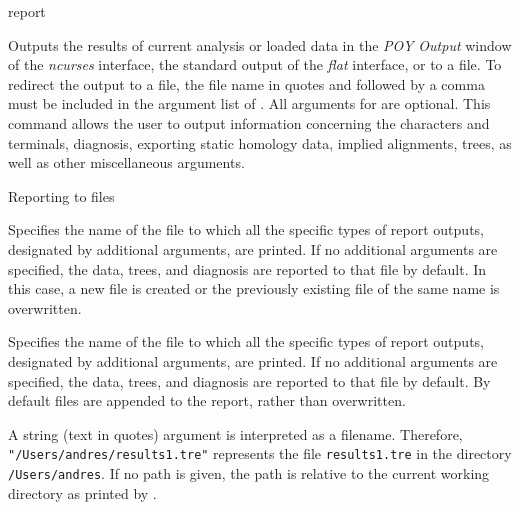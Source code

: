 \begin{command}{report}{}


	\begin{poydescription} 
        Outputs the results of current analysis or loaded data in the \emph{POY Output}
        window of the \emph{ncurses} interface, the standard output of the \emph{flat}
        interface, or to a file. To redirect the output to a file, the file name in 
        quotes and followed by a comma must be included in the argument list
        of . All arguments for  are
        optional.  This command allows the user to output information concerning the 
        characters and terminals, diagnosis, exporting static homology data, implied 
        alignments, trees, as well as other miscellaneous arguments.
	\end{poydescription}

	\begin{arguments}

        \begin{argumentgroup}{Reporting to files}{}

                {Specifies the name of the file to which all the specific types of report outputs,
                designated by additional arguments, are printed. If no additional arguments
                are specified, the data, trees, and diagnosis are reported to that file by
                default. In this case, a new file is created or the previously 
                existing file of the same name is overwritten.} 
                {}


                {Specifies the name of the file to which all the specific types of report outputs,
                designated by additional arguments, are printed. If no additional arguments
                are specified, the data, trees, and diagnosis are reported to that file by
                default. By default files are appended to the report, rather than overwritten.
                
                A string (text in quotes) argument is interpreted as a filename.
                Therefore, \texttt{"/Users/andres/results1.tre"} represents  the file \texttt{results1.tre} in
                the directory \texttt{/Users/andres}. If no path is given, the path
                is relative to the current working directory as printed by .} 
                {}
                

\end{argumentgroup}
\end{arguments}
\end{command}
